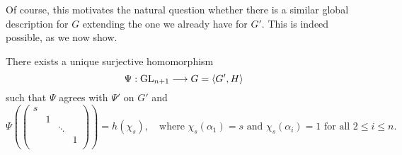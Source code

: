 Of course, this motivates the natural question whether there is a similar global description for $G$ extending the one we already have for $G'$. This is indeed possible, as we now show.

\begin{theorem}\label{thm:chevalley_an}
    There exists a unique surjective homomorphism 
    $$\Psi:\mathrm{GL}_{n+1}\longrightarrow G=\langle G',H\rangle$$
    such that $\Psi$ agrees with $\Psi'$ on $G'$ and 
    $$\Psi\left(\begin{pmatrix}
        s &  & & \\
         & 1 & & \\
         & & \ddots & \\
         & & & 1\\
    \end{pmatrix}\right)=h(\chi_s),\quad\text{where }\chi_s(\alpha_1)=s \text{ and }\chi_s(\alpha_i)=1 \text{ for all }2\leq i\leq n.$$
\end{theorem}
